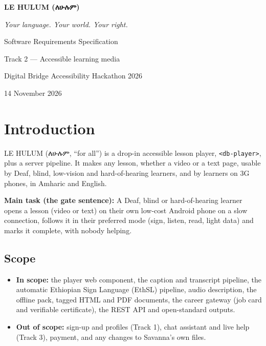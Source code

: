 \documentclass[11pt,a4paper]{article}
\newcommand{\am}[1]{{\ethfont #1}}
\newcommand{\code}[1]{\texttt{#1}}
\begin{document}
\begin{titlepage}
\centering
\vspace*{3cm}
{\Huge\bfseries LE HULUM (\am{ለሁሉም})\par}
\vspace{0.4cm}
{\Large\itshape Your language. Your world. Your right.\par}
\vspace{1.2cm}
{\Large Software Requirements Specification\par}
\vspace{0.3cm}
{\large Track 2 --- Accessible learning media\par}
\vspace{0.3cm}
{\large Digital Bridge Accessibility Hackathon 2026\par}
\vfill
{\large 14 November 2026\par}
\vspace{1cm}
\end{titlepage}

\tableofcontents
\newpage

\section{Introduction}

LE HULUM (\am{ለሁሉም}, ``for all'') is a drop-in accessible lesson player, \code{<db-player>}, plus a server pipeline. It makes any lesson, whether a video or a text page, usable by Deaf, blind, low-vision and hard-of-hearing learners, and by learners on 3G phones, in Amharic and English.

\textbf{Main task (the gate sentence):} A Deaf, blind or hard-of-hearing learner opens a lesson (video or text) on their own low-cost Android phone on a slow connection, follows it in their preferred mode (sign, listen, read, light data) and marks it complete, with nobody helping.

\subsection{Scope}
\begin{itemize}
  \item \textbf{In scope:} the player web component, the caption and transcript pipeline, the automatic Ethiopian Sign Language (EthSL) pipeline, audio description, the offline pack, tagged HTML and PDF documents, the career gateway (job card and verifiable certificate), the REST API and open-standard outputs.
  \item \textbf{Out of scope:} sign-up and profiles (Track 1), chat assistant and live help (Track 3), payment, and any changes to Savanna's own files.
\end{itemize}
\end{document}
